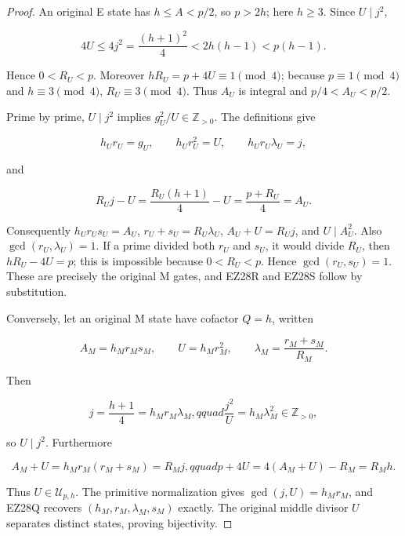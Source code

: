 \documentclass[11pt]{article}
\theoremstyle{definition}\newtheorem{definition}[theorem]{Definition}
\theoremstyle{remark}\newtheorem{remark}[theorem]{Remark}
\begin{document}
\begin{proof}
An original E state has \(h\le A<p/2\), so \(p>2h\); here \(h\ge3\).
Since \(U\mid j^2\),

\[
 4U\le4j^2=\frac{(h+1)^2}{4}<2h(h-1)<p(h-1).
\]

Hence \(0<R_U<p\).  Moreover \(hR_U=p+4U\equiv1\pmod4\); because
\(p\equiv1\pmod4\) and \(h\equiv3\pmod4\),
\(R_U\equiv3\pmod4\).  Thus \(A_U\) is integral and
\(p/4<A_U<p/2\).

Prime by prime, \(U\mid j^2\) implies \(g_U^2/U\in\mathbb Z_{>0}\).
The definitions give

\[
 h_Ur_U=g_U,\qquad h_Ur_U^2=U,\qquad
 h_Ur_U\lambda_U=j,
\]

and

\[
 R_Uj-U=\frac{R_U(h+1)}4-U=\frac{p+R_U}{4}=A_U.
\]

Consequently \(h_Ur_Us_U=A_U\), \(r_U+s_U=R_U\lambda_U\),
\(A_U+U=R_Uj\), and \(U\mid A_U^2\).  Also
\(\gcd(r_U,\lambda_U)=1\).  If a prime divided both \(r_U\) and \(s_U\),
it would divide \(R_U\), then \(hR_U-4U=p\); this is impossible because
\(0<R_U<p\).  Hence \(\gcd(r_U,s_U)=1\).  These are precisely the original
M gates, and EZ28R and EZ28S follow by substitution.

Conversely, let an original M state have cofactor \(Q=h\), written

\[
 A_M=h_Mr_Ms_M,\qquad U=h_Mr_M^2,\qquad
 \lambda_M=\frac{r_M+s_M}{R_M}.
\]

Then

\[
 j=\frac{h+1}{4}=h_Mr_M\lambda_M,qquad
 \frac{j^2}{U}=h_M\lambda_M^2\in\mathbb Z_{>0},
\]

so \(U\mid j^2\).  Furthermore

\[
 A_M+U=h_Mr_M(r_M+s_M)=R_Mj,qquad
 p+4U=4(A_M+U)-R_M=R_Mh.
\]

Thus \(U\in\mathcal U_{p,h}\).  The primitive normalization gives
\(\gcd(j,U)=h_Mr_M\), and EZ28Q recovers
\((h_M,r_M,\lambda_M,s_M)\) exactly.  The original middle divisor \(U\)
separates distinct states, proving bijectivity.
\end{proof}
\end{document}

